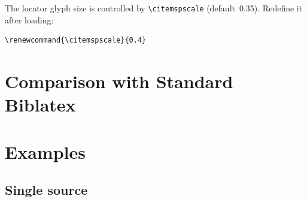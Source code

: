 \documentclass[11pt, a4paper]{article}
\newcommand{\pkg}[1]{\texttt{#1}}
\newcommand{\cmd}[1]{\texttt{\textbackslash #1}}
\begin{document}
The locator glyph size is controlled by \cmd{citemspscale} (default~0.35). Redefine it after loading:
%
\begin{tcolorbox}[colback=gray!5, colframe=gray!40, boxrule=0.5pt, arc=2pt, top=6pt, bottom=6pt, left=10pt, right=10pt]
\begin{verbatim}
\renewcommand{\citemspscale}{0.4}
\end{verbatim}
\end{tcolorbox}


\section{Comparison with Standard Biblatex}







\section{Examples}

\subsection{Single source}
\end{document}
